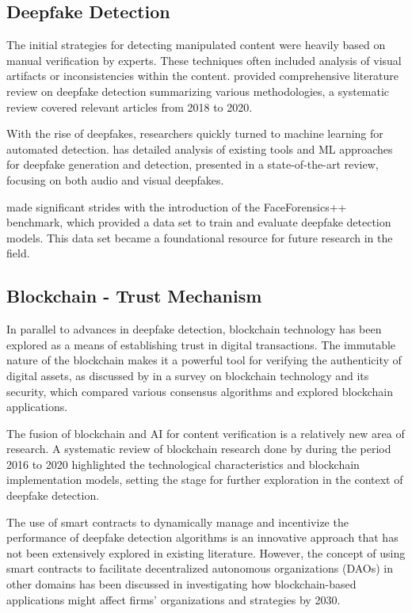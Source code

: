 \documentclass{article}
\begin{document}
\subsection{Deepfake Detection}

The initial strategies for detecting manipulated content were heavily based on manual verification by experts. These techniques often included analysis of visual artifacts or inconsistencies within the content. \citep{9721302} provided comprehensive literature review on deepfake detection summarizing various methodologies, a systematic review covered relevant articles from 2018 to 2020.

With the rise of deepfakes, researchers quickly turned to machine learning for automated detection. \citep{masood2021deepfakes} has detailed analysis of existing tools and ML approaches for deepfake generation and detection, presented in a state-of-the-art review, focusing on both audio and visual deepfakes.

\citep{rössler2019faceforensics} made significant strides with the introduction of the FaceForensics++ benchmark, which provided a data set to train and evaluate deepfake detection models. This data set became a foundational resource for future research in the field.

\subsection{Blockchain - Trust Mechanism}

In parallel to advances in deepfake detection, blockchain technology has been explored as a means of establishing trust in digital transactions. The immutable nature of the blockchain makes it a powerful tool for verifying the authenticity of digital assets, as discussed by \citep{GUO2022100067} in a survey on blockchain technology and its security, which compared various consensus algorithms and explored blockchain applications.

The fusion of blockchain and AI for content verification is a relatively new area of research. A systematic review of blockchain research done by \citep{doi:10.1080/17517575.2021.1939895} during the period 2016 to 2020 highlighted the technological characteristics and blockchain implementation models, setting the stage for further exploration in the context of deepfake detection.

The use of smart contracts to dynamically manage and incentivize the performance of deepfake detection algorithms is an innovative approach that has not been extensively explored in existing literature. However, the concept of using smart contracts to facilitate decentralized autonomous organizations (DAOs) in other domains has been discussed in \citep{10.1371/journal.pone.0258995} investigating how blockchain-based applications might affect firms' organizations and strategies by 2030.
\end{document}
